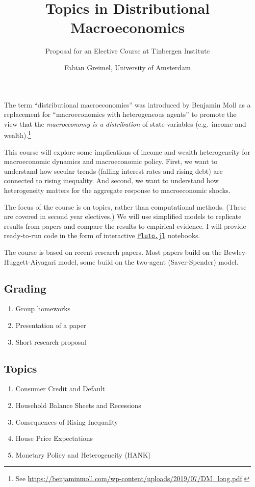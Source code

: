 \documentclass[a4paper,11pt]{article}
\title{Topics in Distributional Macroeconomics}
\date{\vspace{-2ex} Fabian Greimel, University of Amsterdam}
\author{Proposal for an Elective Course at Tinbergen Institute}
\begin{document}
\maketitle

\noindent
The term ``distributional macroeconomics'' was introduced by Benjamin Moll as a replacement for ``macroeconomics with heterogeneous agents'' to promote the view that the \emph{macroeconomy is a distribution} of state variables (e.g.\ income and wealth).\footnote{See \url{ https://benjaminmoll.com/wp-content/uploads/2019/07/DM_long.pdf}.}

This course will explore some implications of income and wealth heterogeneity for macroeconomic dynamics and macroeconomic policy. First, we want to understand how secular trends (falling interest rates and rising debt) are connected to rising inequality. And second, we want to understand how heterogeneity matters for the aggregate response to macroeconomic shocks.

The focus of the course is on topics, rather than computational methods. (These are covered in second year electives.) We will use simplified models to replicate results from papers and compare the results to empirical evidence. I will provide ready-to-run code in the form of interactive \href{https://github.com/fonsp/Pluto.jl}{\texttt{Pluto.jl}} notebooks. 

The course is based on recent research papers. Most papers build on the Bewley-Huggett-Aiyagari model, some build on the two-agent (Saver-Spender) model. 

\subsection*{Grading}

\begin{enumerate}
\item Group homeworks
\item Presentation of a paper
\item Short research proposal
\end{enumerate}

\subsection*{Topics}

\begin{enumerate}
\item Consumer Credit and Default
\item Household Balance Sheets and Recessions
\item Consequences of Rising Inequality
\item House Price Expectations
\item Monetary Policy and Heterogeneity (HANK)
\end{enumerate}
\end{document}
